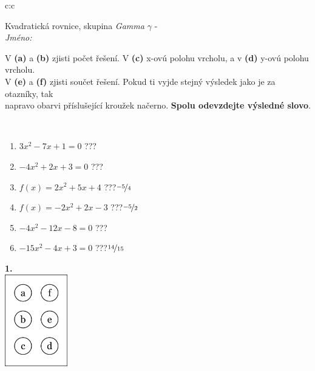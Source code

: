 \documentclass[10pt]{report}
\begin{document}
\begin{tabular}{c:c}
\begin{minipage}[c][104.5mm][t]{0.5\linewidth}
\begin{center}
\vspace{7mm}
{\huge Kvadratická rovnice, skupina \textit{Gamma $\gamma$} -}\\[5mm]
\textit{Jméno:}\phantom{xxxxxxxxxxxxxxxxxxxxxxxxxxxxxxxxxxxxxxxxxxxxxxxxxxxxxxxxxxxxxxxxx}\\[5mm]
\begin{minipage}{0.95\linewidth}
\begin{center}
V \textbf{(a)} a \textbf{(b)} zjisti počet řešení. V \textbf{(c)} x-ovú polohu vrcholu, a v \textbf{(d)} y-ovú polohu vrcholu.\\V \textbf{(e)} a \textbf{(f)} zjisti součet řešení. Pokud ti vyjde stejný výsledek jako je za otazníky, tak\\napravo obarvi příslušející kroužek načerno. \textbf{Spolu odevzdejte výsledné slovo}.
\end{center}
\end{minipage}
\\[1mm]
\begin{minipage}{0.79\linewidth}
\begin{center}
\begin{varwidth}{\linewidth}
\begin{enumerate}
\Large
\item $3x^2-7x+1=0$\quad \dotfill\; ???\;\dotfill {}
\item $-4x^2+2x+3=0$\quad \dotfill\; ???\;\dotfill {}
\item $f(x)=2x^2+5x+4$\quad \dotfill\; ???\;\dotfill \quad $\nicefrac{-5}{4}$
\item $f(x)=-2x^2+2x-3$\quad \dotfill\; ???\;\dotfill \quad $\nicefrac{-5}{2}$
\item $-4x^2-12x-8=0$\quad \dotfill\; ???\;\dotfill {}
\item $-15x^2-4x+3=0$\quad \dotfill\; ???\;\dotfill \quad $\nicefrac{14}{15}$
\end{enumerate}
\end{varwidth}
\end{center}
\end{minipage}
\begin{minipage}{0.20\linewidth}
\begin{center}
{\Huge\bfseries 1.} \\[2mm]
\includegraphics[height=40mm]{../images/braille.png}

\end{center}
\end{minipage}
\end{center}
\end{minipage}
\end{tabular}
\end{document}
